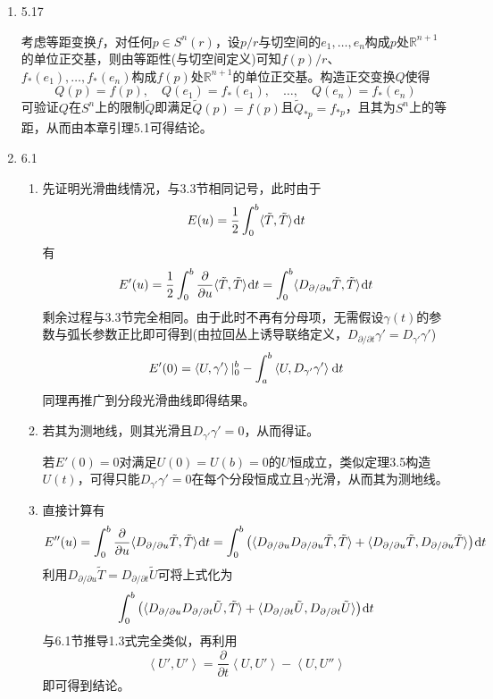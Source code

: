 \documentclass[a4paper,UTF8,fontset=windows,10pt]{ctexart}
\newcommand*{\dr}{\hspace{0.07em}\mathrm{d}}
\begin{document}
\begin{enumerate}
    \item 5.17
    
    考虑等距变换$f$，对任何$p\in S^n(r)$，设$p/r$与切空间的$e_1,\dots,e_n$构成$p$处$\mathbb{R}^{n+1}$的单位正交基，则由等距性(与切空间定义)可知$f(p)/r$、$f_*(e_1),\dots,f_*(e_n)$构成$f(p)$处$\mathbb{R}^{n+1}$的单位正交基。构造正交变换$Q$使得
    $$Q(p)=f(p),\quad Q(e_1)=f_*(e_1),\quad\dots,\quad Q(e_n)=f_*(e_n)$$
    可验证$Q$在$S^n$上的限制$\tilde{Q}$即满足$\tilde{Q}(p)=f(p)$且$\tilde{Q}_{*p}=f_{*p}$，且其为$S^n$上的等距，从而由本章引理5.1可得结论。
    
    \item 6.1
    \begin{enumerate}[(1)]
        \item 先证明光滑曲线情况，与3.3节相同记号，此时由于
        $$E(u)=\frac{1}{2}\int_0^b\langle\tilde{T},\tilde{T}\rangle\dr t$$
        有
        $$E'(u)=\frac{1}{2}\int_0^b\frac{\partial}{\partial u}\langle\tilde{T},\tilde{T}\rangle\dr t=\int_0^b\langle D_{\partial/\partial u}\tilde{T},\tilde{T}\rangle\dr t$$
        剩余过程与3.3节完全相同。由于此时不再有分母项，无需假设$\gamma(t)$的参数与弧长参数正比即可得到(由拉回丛上诱导联络定义，$D_{\partial/\partial t}\gamma'=D_{\gamma'}\gamma'$)
        $$E'(0)=\left<U,\gamma'\right>|_0^b-\int_a^b\left<U,D_{\gamma'}\gamma'\right>\dr t$$
        同理再推广到分段光滑曲线即得结果。
    
        \item 若其为测地线，则其光滑且$D_{\gamma'}\gamma'=0$，从而得证。
        
        若$E'(0)=0$对满足$U(0)=U(b)=0$的$U$恒成立，类似定理3.5构造$U(t)$，可得只能$D_{\gamma'}\gamma'=0$在每个分段恒成立且$\gamma$光滑，从而其为测地线。
    
        \item 直接计算有
        $$E''(u)=\int_0^b\frac{\partial}{\partial u}\langle D_{\partial/\partial u}\tilde{T},\tilde{T}\rangle\dr t=\int_0^b\big(\langle D_{\partial/\partial u}D_{\partial/\partial u}\tilde{T},\tilde{T}\rangle+\langle D_{\partial/\partial u}\tilde{T},D_{\partial/\partial u}\tilde{T}\rangle\big)\dr t$$
        利用$D_{\partial/\partial u}\tilde{T}=D_{\partial/\partial t}\tilde{U}$可将上式化为
        $$\int_0^b\big(\langle D_{\partial/\partial u}D_{\partial/\partial t}\tilde{U},\tilde{T}\rangle+\langle D_{\partial/\partial t}\tilde{U},D_{\partial/\partial t}\tilde{U}\rangle\big)\dr t$$
        与6.1节推导1.3式完全类似，再利用
        $$\left<U',U'\right>=\frac{\partial}{\partial t}\left<U,U'\right>-\left<U,U''\right>$$
        即可得到结论。
    

\end{enumerate}
\end{enumerate}
\end{document}
